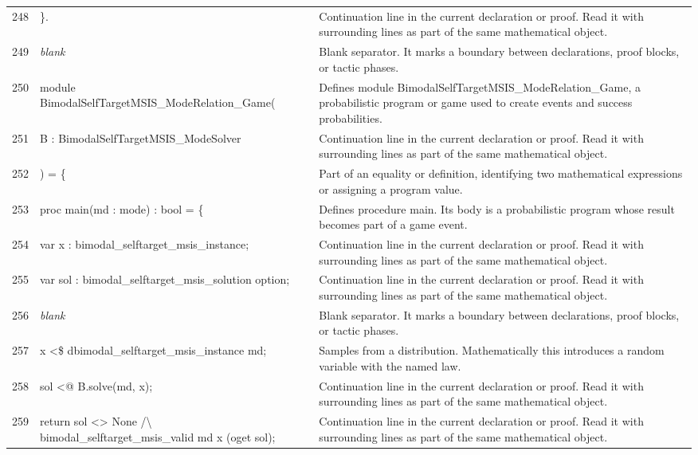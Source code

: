 \documentclass[10pt]{article}
\begin{document}
\begin{longtable}{r L{0.53\textwidth} L{0.37\textwidth}}
248 & {\ttfamily\scriptsize \}.} & Continuation line in the current declaration or proof.  Read it with surrounding lines as part of the same mathematical object. \\
249 & {\ttfamily\scriptsize \emph{blank}} & Blank separator.  It marks a boundary between declarations, proof blocks, or tactic phases. \\
250 & {\ttfamily\scriptsize module BimodalSelfTargetMSIS\_ModeRelation\_Game(} & Defines module BimodalSelfTargetMSIS\_ModeRelation\_Game, a probabilistic program or game used to create events and success probabilities. \\
251 & {\ttfamily\scriptsize   B : BimodalSelfTargetMSIS\_ModeSolver} & Continuation line in the current declaration or proof.  Read it with surrounding lines as part of the same mathematical object. \\
252 & {\ttfamily\scriptsize ) = \{} & Part of an equality or definition, identifying two mathematical expressions or assigning a program value. \\
253 & {\ttfamily\scriptsize   proc main(md : mode) : bool = \{} & Defines procedure main.  Its body is a probabilistic program whose result becomes part of a game event. \\
254 & {\ttfamily\scriptsize     var x : bimodal\_selftarget\_msis\_instance;} & Continuation line in the current declaration or proof.  Read it with surrounding lines as part of the same mathematical object. \\
255 & {\ttfamily\scriptsize     var sol : bimodal\_selftarget\_msis\_solution option;} & Continuation line in the current declaration or proof.  Read it with surrounding lines as part of the same mathematical object. \\
256 & {\ttfamily\scriptsize \emph{blank}} & Blank separator.  It marks a boundary between declarations, proof blocks, or tactic phases. \\
257 & {\ttfamily\scriptsize     x <\$ dbimodal\_selftarget\_msis\_instance md;} & Samples from a distribution.  Mathematically this introduces a random variable with the named law. \\
258 & {\ttfamily\scriptsize     sol <@ B.solve(md, x);} & Continuation line in the current declaration or proof.  Read it with surrounding lines as part of the same mathematical object. \\
259 & {\ttfamily\scriptsize     return sol <> None /\textbackslash{} bimodal\_selftarget\_msis\_valid md x (oget sol);} & Continuation line in the current declaration or proof.  Read it with surrounding lines as part of the same mathematical object. \\

\end{longtable}
\end{document}
